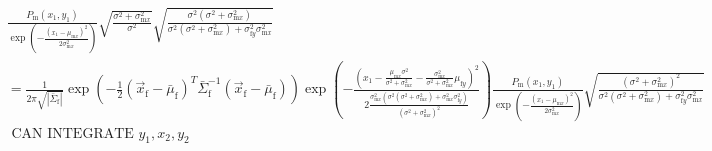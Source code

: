 \documentclass{article}
\newcommand{\x}[1]{\text{#1}}
\begin{document}
\begin{landscape}
\begin{align*}
\\&\frac{P_\x{m}(x_1,y_1)}{\exp\left(-\frac{(x_1-\mu_{\x{m}x})^2}{2\sigma_{\x{m}x}^2}\right)}\sqrt{\frac{\sigma^2+\sigma_{\x{m}x}^2}{\sigma^2}}\sqrt{\frac{\sigma^2(\sigma^2+\sigma_{\x{m}x}^2)}{\sigma^2(\sigma^2+\sigma_{\x{m}x}^2)+\sigma_{\x{f}y}^2\sigma_{\x{m}x}^2}}
\\&=\frac{1}{2\pi\sqrt{|\bar{\Sigma}_{\x{f}}|}}\exp\left(-\frac{1}{2}(\vec{x}_\x{f}-\bar{\mu}_{\x{f}})^T\bar{\Sigma}_\x{f}^{-1}(\vec{x}_\x{f}-\bar{\mu}_\x{f})\right)\exp\left(-\frac{\left(x_1-\frac{\mu_{\x{m}x}\sigma^2}{\sigma^2+\sigma_{\x{m}x}^2}-\frac{\sigma_{\x{m}x}^2}{\sigma^2+\sigma_{\x{m}x}^2}\mu_{\x{f}y}\right)^2}{2\frac{\sigma_{\x{m}x}^2(\sigma^2(\sigma^2+\sigma_{\x{m}x}^2)+\sigma_{\x{m}x}^2\sigma_{\x{f}y}^2)}{(\sigma^2+\sigma_{\x{m}x}^2)^2}}\right)\frac{P_\x{m}(x_1,y_1)}{\exp\left(-\frac{(x_1-\mu_{\x{m}x})^2}{2\sigma_{\x{m}x}^2}\right)}\sqrt{\frac{(\sigma^2+\sigma_{\x{m}x}^2)^2}{\sigma^2(\sigma^2+\sigma_{\x{m}x}^2)+\sigma_{\x{f}y}^2\sigma_{\x{m}x}^2}} 
\\&\text{ CAN INTEGRATE } y_1,x_2,y_2
\end{align*}


\end{landscape}
\end{document}
